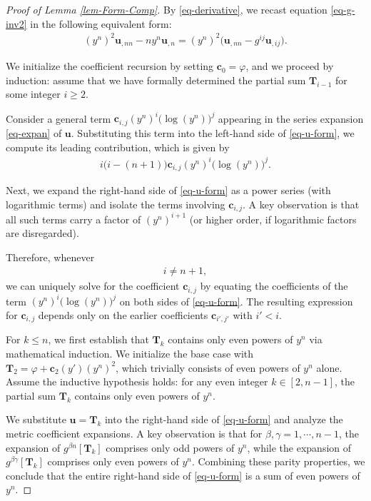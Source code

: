 \documentclass[11pt,reqno]{amsart}
\renewcommand{\leq}{\leqslant}
\renewcommand{\geq}{\geqslant}
\theoremstyle{definition}
\numberwithin{equation}{section}
\begin{document}
\begin{proof}[Proof of Lemma \ref{lem-Form-Comp}]
    By \eqref{eq-derivative}, we recast equation \eqref{eq-g-inv2} in the following equivalent form:
    \begin{align}\label{eq-u-form}
        (y^n)^2\mathbf{u}_{,nn} - n y^n\mathbf{u}_{,n} =(y^n)^2\bigl( \mathbf{u}_{,nn}- g^{ij}\mathbf{u}_{,ij}\bigr).
    \end{align}

    We initialize the coefficient recursion by setting $\mathbf{c}_0=\varphi$, and we proceed by induction: assume that we have formally determined the partial sum $\mathbf{T}_{i-1}$ for some integer $i\geq 2$.

    Consider a general term $\mathbf{c}_{i,j} (y^n)^i\bigl(\log (y^n)\bigr)^j$ appearing in the series expansion \eqref{eq-expan} of $\mathbf{u}$. Substituting this term into the left-hand side of \eqref{eq-u-form}, we compute its leading contribution, which is given by
    \begin{align}\label{eq-c-domi}
        i\bigl(i-(n+1)\bigr)\mathbf{c}_{i,j} (y^n)^i\bigl(\log (y^n)\bigr)^j.
    \end{align}

    Next, we expand the right-hand side of \eqref{eq-u-form} as a power series (with logarithmic terms) and isolate the terms involving $\mathbf{c}_{i,j}$. A key observation is that all such terms carry a factor of $(y^n)^{i+1}$ (or higher order, if logarithmic factors are disregarded). 

    Therefore, whenever 
    \begin{align}
        i\neq n+1,
    \end{align}
    we can uniquely solve for the coefficient $\mathbf{c}_{i,j}$ by equating the coefficients of the term $(y^n)^i\bigl(\log (y^n)\bigr)^j$ on both sides of \eqref{eq-u-form}. The resulting expression for $\mathbf{c}_{i,j}$ depends only on the earlier coefficients $\mathbf{c}_{i', j'}$ with $i'<i$.


For $k\leq n$, we first establish that $\mathbf{T}_k$ contains only even powers of $y^n$ via mathematical induction. We initialize the base case with $\mathbf{T}_2 = \varphi + \mathbf{c}_2(y')(y^n)^2$, which trivially consists of even powers of $y^n$ alone. Assume the inductive hypothesis holds: for any even integer  $k\in [2, n-1] $, the partial sum $\mathbf{T}_k$ contains only even powers of $y^n$.

We substitute $\mathbf{u}=\mathbf{T}_k$ into the right-hand side of \eqref{eq-u-form} and analyze the metric coefficient expansions. A key observation is that for $\beta,\gamma=1,\cdots, n-1$, the expansion of $g^{\beta n}[\mathbf{T}_k]$ comprises only odd powers of $y^n$, while the expansion of $g^{\beta \gamma}[\mathbf{T}_k]$ comprises only even powers of $y^n$. Combining these parity properties, we conclude that the entire right-hand side of \eqref{eq-u-form} is a sum of even powers of $y^n$.


\end{proof}
\end{document}
